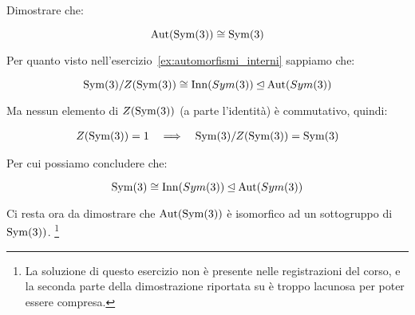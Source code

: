 \begin{esercizio}
	Dimostrare che:
	
	\begin{equation}
		\operatorname{Aut}(\operatorname{Sym}(3)) \cong \operatorname{Sym}(3)
	\end{equation}
\end{esercizio}
\begin{soluzione}
	Per quanto visto nell'esercizio~\ref{ex:automorfismi_interni} sappiamo che:
	
	\begin{equation}
		\operatorname{Sym}(3) / Z(\operatorname{Sym}(3)) \cong \operatorname{Inn}(Sym(3)) \unlhd \operatorname{Aut}(Sym(3))
	\end{equation}

	Ma nessun elemento di $Z(\operatorname{Sym}(3))$ (a parte l'identità) è commutativo, quindi:
	
	\begin{gather}
		Z(\operatorname{Sym}(3)) = 1 \quad\Longrightarrow\quad \operatorname{Sym}(3) / Z(\operatorname{Sym}(3)) = \operatorname{Sym}(3)
	\end{gather}

	Per cui possiamo concludere che:
	
	\begin{equation}
		\operatorname{Sym}(3) \cong \operatorname{Inn}(Sym(3)) \unlhd \operatorname{Aut}(Sym(3))
	\end{equation}

	Ci resta ora da dimostrare che $\operatorname{Aut}(\operatorname{Sym}(3))$ è isomorfico ad un sottogruppo di $\operatorname{Sym}(3))$.
	\footnote{La soluzione di questo esercizio non è presente nelle registrazioni del corso, e la seconda parte della dimostrazione riportata su \cite{lucchini_week} è troppo lacunosa per poter essere compresa.}
\end{soluzione}